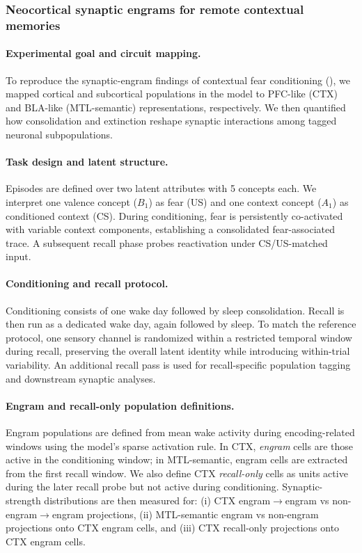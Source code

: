 \documentclass{article}
\begin{document}
\subsubsection*{Neocortical synaptic engrams for remote contextual memories }

\paragraph{Experimental goal and circuit mapping.}
To reproduce the synaptic-engram findings of contextual fear conditioning (), we mapped cortical and subcortical populations in the model to PFC-like (CTX) and BLA-like (MTL-semantic) representations, respectively. We then quantified how consolidation and extinction reshape synaptic interactions among tagged neuronal subpopulations.

\paragraph{Task design and latent structure.}
Episodes are defined over two latent attributes with 5 concepts each. We interpret one valence concept ($B_1$) as fear (US) and one context concept ($A_1$) as conditioned context (CS). During conditioning, fear is persistently co-activated with variable context components, establishing a consolidated fear-associated trace. A subsequent recall phase probes reactivation under CS/US-matched input.

\paragraph{Conditioning and recall protocol.}
Conditioning consists of one wake day followed by sleep consolidation. Recall is then run as a dedicated wake day, again followed by sleep. To match the reference protocol, one sensory channel is randomized within a restricted temporal window during recall, preserving the overall latent identity while introducing within-trial variability. An additional recall pass is used for recall-specific population tagging and downstream synaptic analyses.

\paragraph{Engram and recall-only population definitions.}
Engram populations are defined from mean wake activity during encoding-related windows using the model's sparse activation rule. In CTX, \emph{engram} cells are those active in the conditioning window; in MTL-semantic, engram cells are extracted from the first recall window. We also define CTX \emph{recall-only} cells as units active during the later recall probe but not active during conditioning. Synaptic-strength distributions are then measured for: (i) CTX engram$\rightarrow$engram vs non-engram$\rightarrow$engram projections, (ii) MTL-semantic engram vs non-engram projections onto CTX engram cells, and (iii) CTX recall-only projections onto CTX engram cells.
\end{document}
